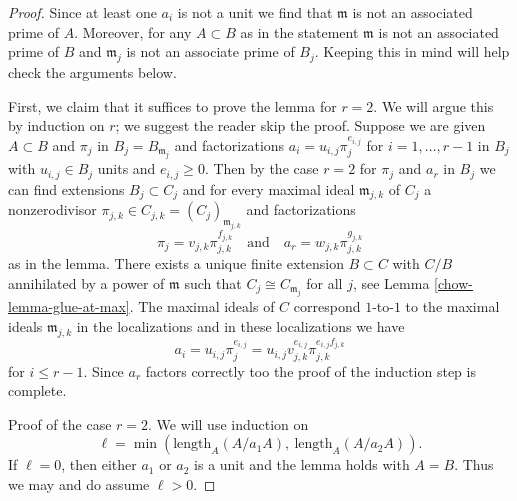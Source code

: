 \begin{proof}

Since at least one $a_i$ is not a unit we find that $\mathfrak m$
is not an associated prime of $A$. Moreover, for any $A \subset B$
as in the statement $\mathfrak m$ is not an associated prime of $B$
and $\mathfrak m_j$ is not an associate prime of $B_j$.
Keeping this in mind will help check the arguments below.

\medskip\noindent
First, we claim that it suffices to prove the lemma for $r = 2$.
We will argue this by induction on $r$; we suggest the reader
skip the proof. Suppose we are given $A \subset B$ and $\pi_j$ in
$B_j = B_{\mathfrak m_j}$ and factorizations
$a_i = u_{i, j} \pi_j^{e_{i, j}}$ for $i = 1, \ldots, r - 1$ in $B_j$
with $u_{i, j} \in B_j$ units and $e_{i, j} \geq 0$.
Then by the case $r = 2$ for $\pi_j$ and $a_r$ in $B_j$
we can find extensions $B_j \subset C_j$ and for every maximal ideal
$\mathfrak m_{j, k}$ of $C_j$ a nonzerodivisor
$\pi_{j, k} \in C_{j, k} = (C_j)_{\mathfrak m_{j, k}}$
and factorizations
$$
\pi_j = v_{j, k} \pi_{j, k}^{f_{j, k}}
\quad\text{and}\quad
a_r = w_{j, k} \pi_{j, k}^{g_{j, k}}
$$
as in the lemma. There exists a unique finite extension $B \subset C$
with $C/B$ annihilated by a power of $\mathfrak m$ such
that $C_j \cong C_{\mathfrak m_j}$ for all $j$, see
Lemma \ref{chow-lemma-glue-at-max}.
The maximal ideals of $C$ correspond $1$-to-$1$
to the maximal ideals $\mathfrak m_{j, k}$ in the localizations
and in these localizations we have
$$
a_i = u_{i, j} \pi_j^{e_{i, j}} =
u_{i, j} v_{j, k}^{e_{i, j}} \pi_{j, k}^{e_{i, j}f_{j, k}}
$$
for $i \leq r - 1$. Since $a_r$ factors correctly too the
proof of the induction step is complete.

\medskip\noindent
Proof of the case $r = 2$. We will use induction on
$$
\ell = \min(\text{length}_A(A/a_1A),\ \text{length}_A(A/a_2A)).
$$
If $\ell = 0$, then either $a_1$ or $a_2$ is a unit and
the lemma holds with $A = B$. Thus we may and do assume $\ell > 0$.


\end{proof}
